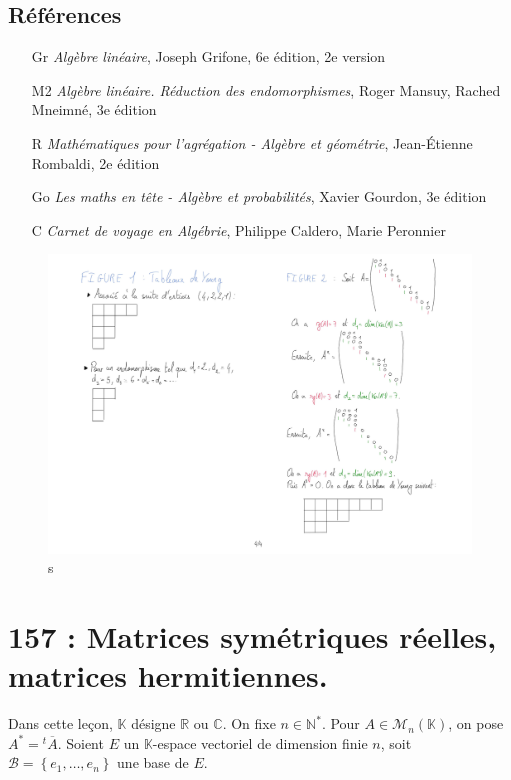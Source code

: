 \documentclass[10pt, a4paper, parskip=full, twoside, twocolumn]{report}
\newcommand{\IN}{\mathbb{N}}
\newcommand{\IK}{\mathbb{K}}
\newcommand{\IC}{\mathbb{C}}
\newcommand{\IR}{\mathbb{R}}
\newcommand{\M}{\mathcal{M}}
\newcommand{\B}{\mathcal{B}}
\begin{document}
\section*{Références}
\begin{itemize}
	\item[Gr] \emph{Algèbre linéaire}, Joseph Grifone, 6e édition, 2e version
	\item[M2] \emph{Algèbre linéaire. Réduction des endomorphismes}, Roger Mansuy, Rached Mneimné, 3e édition
	\item[R] \emph{Mathématiques pour l'agrégation - Algèbre et géométrie}, Jean-Étienne Rombaldi, 2e édition
	\item[Go] \emph{Les maths en tête - Algèbre et probabilités}, Xavier Gourdon, 3e édition
	\item[C] \emph{Carnet de voyage en Algébrie}, Philippe Caldero, Marie Peronnier
\end{itemize}
\begin{figure}[!htb]
	\centering
	\includegraphics[trim={0 0 0 0},clip,width=1\linewidth]{img/156.pdf}
	\caption{s}
\end{figure}

\chapter*{157 : Matrices symétriques réelles, matrices hermitiennes.}
\setcounter{definition}{0}
\textcolor{paragraphtext}{Dans cette leçon, $\IK$ désigne $\IR$ ou $\IC$.
On fixe $n\in\IN^*$. Pour $A\in \M_n(\IK)$, on pose $A^*={}^t\overline{A}$.
Soient $E$ un $\IK$-espace vectoriel de dimension finie $n$, soit $\B=\left\{e_1,\dots,e_n\right\}$
une base de $E$.}
\end{document}
